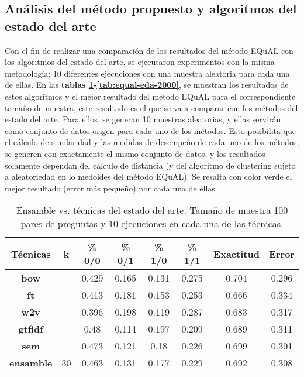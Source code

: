 \subsection{Análisis del método propuesto y algoritmos del estado del arte}

Con el fin de realizar una comparación de los resultados del método EQuAL con los algoritmos del estado del arte, se ejecutaron experimentos con la misma metodología: 10 diferentes ejecuciones con una muestra aleatoria para cada una de ellas. En las \textbf{tablas \ref{tab:equal-eda-100}-\ref{tab:equal-eda-2000}}, se muestran los resultados de estos algoritmos y el mejor resultado del método EQuAL para el correspondiente tamaño de muestra, este resultado es el que se va a comparar con los métodos del estado del arte. Para ellos, se generan 10 muestras aleatorias, y ellas servirán como conjunto de datos origen para cada uno de los métodos. Esto posibilita que el cálculo de similaridad y las medidas de desempeño de cada uno de los métodos, se generen con exactamente el mismo conjunto de datos, y los resultados solamente dependan del cálculo de distancia (y del algoritmo de clustering sujeto a aleatoriedad en lo medoides del método EQuAL). Se resalta con color verde el mejor resultado (error más pequeño) por cada una de ellas.

\begin{table}[]
	\centering
	\footnotesize
	\begin{tabular}{|c|c|c|c|c|c|c|c|}
		\hline
		\rowcolor[HTML]{CFE2F3}
		\textbf{Técnicas} &
		\textbf{k} &
		\textbf{\% 0/0} &
		\textbf{\% 0/1} &
		\textbf{\% 1/0} &
		\textbf{\% 1/1} &
		\textbf{Exactitud} &
		\textbf{Error} \\ \hline
		\textbf{bow} &
		--- &
		0.429 &
		0.165 &
		0.131 &
		0.275 &
		\cellcolor[HTML]{D9EAD3}0.704 &
		\cellcolor[HTML]{D9EAD3}0.296 \\ \hline
		\textbf{ft}       & --- & 0.413 & 0.181 & 0.153 & 0.253 & 0.666 & 0.334 \\ \hline
		\textbf{w2v}      & --- & 0.396 & 0.198 & 0.119 & 0.287 & 0.683 & 0.317 \\ \hline
		\textbf{gtfidf}   & --- & 0.48  & 0.114 & 0.197 & 0.209 & 0.689 & 0.311 \\ \hline
		\textbf{sem}      & --- & 0.473 & 0.121 & 0.18  & 0.226 & 0.699 & 0.301 \\ \hline
		\textbf{ensamble} & 30  & 0.463 & 0.131 & 0.177 & 0.229 & 0.692 & 0.308 \\ \hline
	\end{tabular}
	\caption{Ensamble vs. técnicas del estado del arte. Tamaño de muestra 100 pares de preguntas y 10 ejecuciones en cada una de las técnicas.}
	\label{tab:equal-eda-100}
\end{table}

